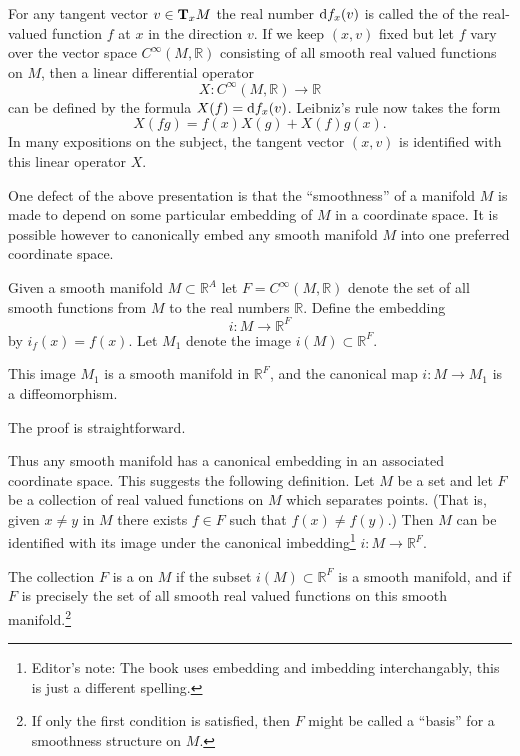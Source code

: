 \documentclass[../main]{subfiles}
\begin{document}
For any tangent vector $v \in \tangentspace M x$ the real number $\differential f x(v)$ is called the  of the real-valued function $f$ at $x$ in the direction $v$. If we keep $(x, v)$ fixed but let $f$ vary over the vector space $C^\infty(M, \mathbb R)$ consisting of all smooth real valued functions on $M$, then a linear differential operator \[X : C^\infty(M, \mathbb R) \longrightarrow \mathbb R\] can be defined by the formula $X(f) = \differential f x(v)$. Leibniz's rule now takes the form \[X(fg) = f(x) X(g) + X(f) g(x).\] In many expositions on the subject, the tangent vector $(x, v)$ is identified with this linear operator $X$. 

One defect of the above presentation is that the ``smoothness'' of a manifold $M$ is made to depend on some particular embedding of $M$ in a coordinate space. It is possible however to canonically embed any smooth manifold $M$ into one preferred coordinate space.

Given a smooth manifold $M \subset {\mathbb R}^A$ let $F = C^\infty(M, \mathbb R)$ denote the set of all smooth functions from $M$ to the real numbers $\mathbb R$. Define the embedding \[i : M \longrightarrow {\mathbb R}^F\] by $i_f(x) = f(x)$. Let $M_1$ denote the image $i(M) \subset {\mathbb R}^F$. 

\begin{lemma}
\label{lem:1.5}
This image $M_1$ is a smooth manifold in ${\mathbb R}^F$, and the canonical map $i : M \longrightarrow M_1$ is a diffeomorphism.
\end{lemma}

The proof is straightforward. 

Thus any smooth manifold has a canonical embedding in an associated coordinate space. This suggests the following definition. 
Let $M$ be a set and let $F$ be a collection of real valued functions on $M$ which separates points. (That is, given $x \ne y$ in $M$ there exists $f \in F$ such that $f(x) \ne f(y)$.) Then $M$ can be identified with its image under the canonical imbedding\footnote{Editor's note: The book uses embedding and imbedding interchangably, this is just a different spelling.} $i : M \longrightarrow {\mathbb R}^F$.

\begin{definition}
The collection $F$ is a  on $M$ if the subset $i(M) \subset {\mathbb R}^F$ is a smooth manifold, and if $F$ is precisely the set of all smooth real valued functions on this smooth manifold.\footnote{If only the first condition is satisfied, then $F$ might be called a ``basis'' for a smoothness structure on $M$.}
\end{definition}
\end{document}
